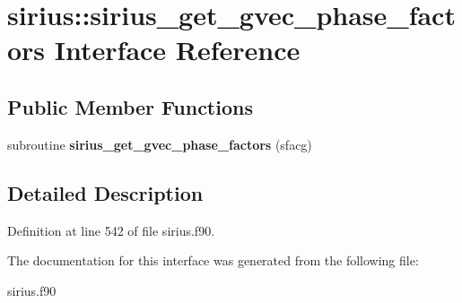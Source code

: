 \hypertarget{interfacesirius_1_1sirius__get__gvec__phase__factors}{}\section{sirius\+:\+:sirius\+\_\+get\+\_\+gvec\+\_\+phase\+\_\+factors Interface Reference}
\label{interfacesirius_1_1sirius__get__gvec__phase__factors}
\subsection*{Public Member Functions}
\begin{DoxyCompactItemize}
\item 
\hypertarget{interfacesirius_1_1sirius__get__gvec__phase__factors_a1517a1f3bfdc49c09428d043889e4613}{}subroutine {\bfseries sirius\+\_\+get\+\_\+gvec\+\_\+phase\+\_\+factors} (sfacg)\label{interfacesirius_1_1sirius__get__gvec__phase__factors_a1517a1f3bfdc49c09428d043889e4613}

\end{DoxyCompactItemize}


\subsection{Detailed Description}


Definition at line 542 of file sirius.\+f90.



The documentation for this interface was generated from the following file\+:\begin{DoxyCompactItemize}
\item 
sirius.\+f90\end{DoxyCompactItemize}
